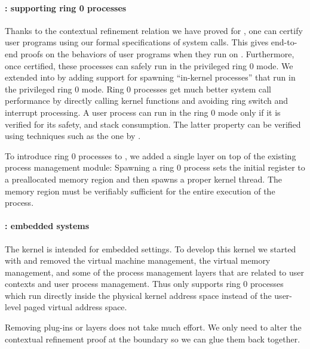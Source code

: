 \paragraph{\mCTOSringz{}: supporting ring 0 processes}

Thanks to the contextual refinement relation we have proved for
\mCTOSbase{}, one can certify user programs using our formal
specifications of system calls. This gives end-to-end proofs on
the behaviors of user programs when they run on \mCTOSbase{}.  
Furthermore, once certified, these processes can safely run in
the privileged ring 0 mode.  We extended \mCTOSbase{} into
\mCTOSringz{} by adding support for spawning ``in-kernel
processes'' that run in the privileged ring 0 mode. 
Ring 0 processes get much
better system call performance by directly calling kernel
functions and avoiding ring switch and interrupt processing. 
A user process can run in the ring 0 mode
only if it is verified for its safety,
and stack consumption. 
The latter property can be verified using techniques
such as the one by \citet{veristack}.

To introduce ring 0 processes to \mCTOSbase{},
we added a single layer on top of the existing process management module:
Spawning a ring 0 process sets the initial  register to a
preallocated memory region and then spawns a proper kernel thread. The
memory region must be verifiably sufficient for the entire execution
of the process. 

\paragraph{\mCTOSembed{}: embedded systems}
The \mCTOSembed{} kernel is intended for embedded settings. To develop
this kernel we started with \mCTOSringz{} and removed the virtual machine management, the virtual
memory management, and some of the process management layers that are
related to user contexts and user process management.  Thus
\mCTOSembed{} only supports ring 0 processes which run directly inside
the physical kernel address space instead of the user-level paged
virtual address space.

Removing plug-ins or layers does not take much effort.
We only need to alter the contextual refinement proof 
at the boundary so we can glue them back together.

